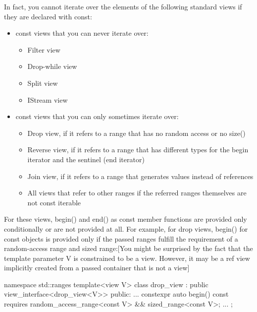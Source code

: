 In fact, you cannot iterate over the elements of the following standard views if they are declared with const:

\begin{itemize}
\item
const views that you can never iterate over:

\begin{itemize}
\item
Filter view

\item
Drop-while view

\item
Split view

\item
IStream view
\end{itemize}

\item
const views that you can only sometimes iterate over:

\begin{itemize}
\item
Drop view, if it refers to a range that has no random access or no size()

\item
Reverse view, if it refers to a range that has different types for the begin iterator and the sentinel (end iterator)

\item
Join view, if it refers to a range that generates values instead of references

\item
All views that refer to other ranges if the referred ranges themselves are not const iterable
\end{itemize}
\end{itemize}

For these views, begin() and end() as const member functions are provided only conditionally or are not provided at all. For example, for drop views, begin() for const objects is provided only if the passed ranges fulfill the requirement of a random-access range and sized range:[You might be surprised by the fact that the template parameter V is constrained to be a view. However, it may be a ref view implicitly created from a passed container that is not a view]


\begin{cpp}
namespace std::ranges {
	template<view V>
	class drop_view : public view_interface<drop_view<V>> {
		public:
		...
		constexpr auto begin() const requires random_access_range<const V>
		&& sized_range<const V>;
		...
	};
}
\end{cpp}

